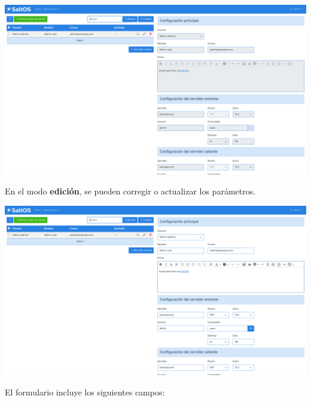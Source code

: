 \documentclass[a4paper]{article}
\begin{document}
\begin{center}\includegraphics[width=1\textwidth]{../ujest/snaps/test-screenshots-js-screenshots-emails-emails-accounts-view-1-es-es-1-snap.png}\end{center}

En el modo \textbf{edición}, se pueden corregir o actualizar los parámetros.

\begin{center}\includegraphics[width=1\textwidth]{../ujest/snaps/test-screenshots-js-screenshots-emails-emails-accounts-edit-1-es-es-1-snap.png}\end{center}

El formulario incluye los siguientes campos:
\end{document}
